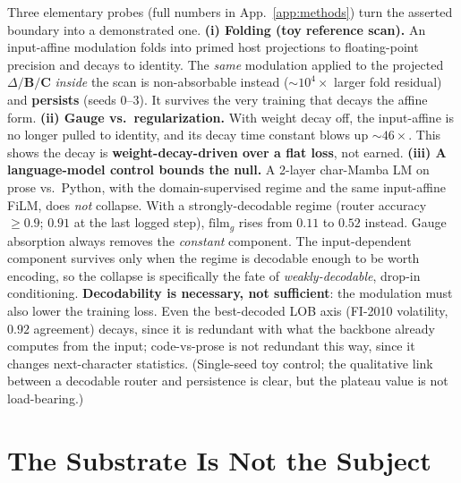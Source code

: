 \documentclass{article}
\begin{document}
Three elementary probes (full numbers in App.~\ref{app:methods})
turn the asserted boundary into a demonstrated one. \textbf{(i) Folding (toy
reference scan).} An input-affine modulation folds into primed host projections to
floating-point precision and decays to identity. The \emph{same} modulation
applied to the projected $\Delta/\mathbf{B}/\mathbf{C}$ \emph{inside} the scan is
non-absorbable instead ($\sim10^4\times$ larger fold residual) and
\textbf{persists} (seeds 0--3). It survives the very training that decays the
affine form. \textbf{(ii) Gauge vs.\ regularization.} With weight decay off, the
input-affine is no longer pulled to identity, and its decay time constant blows up
${\sim}46\times$. This shows the decay is \textbf{weight-decay-driven over a flat
loss}, not earned. \textbf{(iii) A language-model control bounds the null.} A
2-layer char-Mamba LM on prose vs.\ Python, with the domain-supervised regime and
the same input-affine FiLM, does \emph{not} collapse. With a strongly-decodable
regime (router accuracy $\ge0.9$; $0.91$ at the last logged step), $\mathrm{film}_g$
rises from $0.11$ to $0.52$ instead. Gauge absorption always removes the \emph{constant} component. The
input-dependent component survives only when the regime is decodable enough to be
worth encoding, so the collapse is specifically the fate of \emph{weakly-decodable},
drop-in conditioning. \textbf{Decodability is necessary, not sufficient}: the
modulation must also lower the training loss. Even the best-decoded LOB axis
(FI-2010 volatility, $0.92$ agreement) decays, since it is redundant with what the
backbone already computes from the input; code-vs-prose is not redundant this way,
since it changes next-character statistics. (Single-seed toy control; the qualitative link
between a decodable router and persistence is clear, but the plateau value is not
load-bearing.)

\section{The Substrate Is Not the Subject}\label{sec:substrate}
\end{document}

